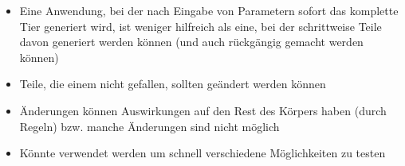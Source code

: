 \begin{itemize}
 \item Eine Anwendung, bei der nach Eingabe von Parametern sofort das komplette Tier generiert wird, ist weniger hilfreich als eine, bei der schrittweise Teile davon generiert werden können (und auch rückgängig gemacht werden können)
 \item Teile, die einem nicht gefallen, sollten geändert werden können
 \item Änderungen können Auswirkungen auf den Rest des Körpers haben (durch Regeln) bzw. manche Änderungen sind nicht möglich
 \item Könnte verwendet werden um schnell verschiedene Möglichkeiten zu testen
\end{itemize}



